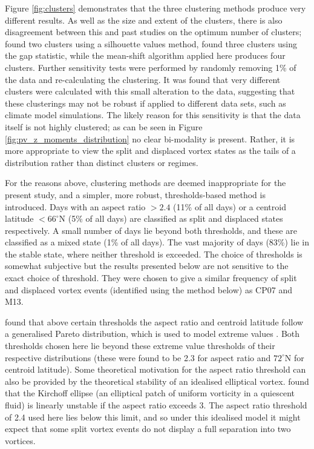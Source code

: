 \bigskip Figure \ref{fig:clusters} demonstrates that the three clustering methods
produce very different results. As well as the size and extent of the clusters,
there is also disagreement between this and past studies on the optimum number
of clusters; \citet{K.Coughlin2009} found two clusters using a silhouette values
method, \citet{Hannachi2010} found three clusters using the gap statistic, while
the mean-shift algorithm applied here produces four clusters. Further
sensitivity tests were performed by randomly removing 1\% of the data and
re-calculating the clustering. It was found that very different clusters were
calculated with this small alteration to the data, suggesting that these
clusterings may not be robust if applied to different data sets, such as climate
model simulations. The likely reason for this sensitivity is that the data
itself is not highly clustered; as can be seen in Figure
\ref{fig:pv_z_moments_distribution} no clear bi-modality is present. Rather, it
is more appropriate to view the split and displaced vortex states as the tails
of a distribution rather than distinct clusters or regimes.

For the reasons above, clustering methods are deemed inappropriate for the
present study, and a simpler, more robust, thresholds-based method is
introduced. Days with an aspect ratio $>2.4$ (11\% of all days) or a centroid
latitude $<66^{\circ}$N (5\% of all days) are classified as split and displaced
states respectively. A small number of days lie beyond both thresholds, and
these are classified as a mixed state (1\% of all days). The vast majority of
days (83\%) lie in the stable state, where neither threshold is exceeded. The
choice of thresholds is somewhat subjective but the results presented below are
not sensitive to the exact choice of threshold. They were chosen to give a
similar frequency of split and displaced vortex events (identified using the
method below) as CP07 and M13. 

\citet{Mitchell2011} found that above certain thresholds the aspect ratio and
centroid latitude follow a generalised Pareto distribution, which is used to
model extreme values \citep{Cole}. Both thresholds chosen here lie beyond these
extreme value thresholds of their respective distributions (these were found to
be 2.3 for aspect ratio and $72^{\circ}$N for centroid latitude). Some
theoretical motivation for the aspect ratio threshold can also be provided by
the theoretical stability of an idealised elliptical vortex. \citet{Love1893}
found that the Kirchoff ellipse (an elliptical patch of uniform vorticity in a
quiescent fluid) is linearly unstable if the aspect ratio exceeds 3. The aspect
ratio threshold of 2.4 used here lies below this limit, and so under this
idealised model it might expect that some split vortex events do not display a
full separation into two vortices.

